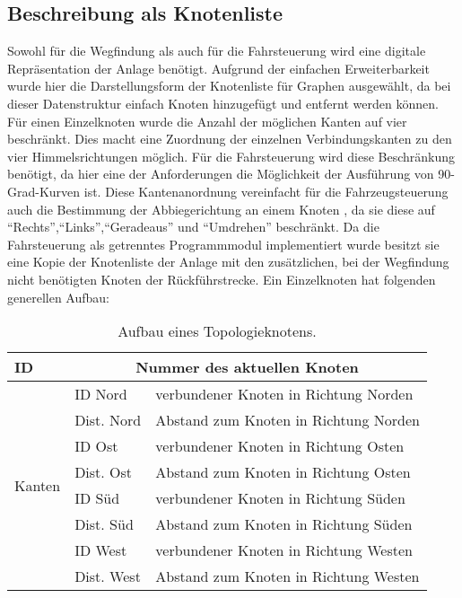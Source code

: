 		\subsection{Beschreibung als Knotenliste}
			\label{Knotenliste}
			Sowohl für die Wegfindung als auch für die Fahrsteuerung wird eine digitale Repräsentation der Anlage benötigt. Aufgrund der einfachen Erweiterbarkeit wurde hier die Darstellungsform der Knotenliste für Graphen ausgewählt, da bei dieser Datenstruktur einfach Knoten hinzugefügt und entfernt werden können. Für einen Einzelknoten wurde die Anzahl der möglichen Kanten auf vier beschränkt. Dies macht eine Zuordnung der einzelnen Verbindungskanten zu den vier Himmelsrichtungen möglich. Für die Fahrsteuerung wird diese Beschränkung benötigt, da hier eine der Anforderungen die Möglichkeit der Ausführung von 90-Grad-Kurven ist. Diese Kantenanordnung vereinfacht für die Fahrzeugsteuerung auch die Bestimmung der Abbiegerichtung an einem Knoten , da sie diese auf "`Rechts"',"`Links"',"`Geradeaus"' und "`Umdrehen"' beschränkt. Da die Fahrsteuerung als getrenntes Programmmodul implementiert wurde besitzt sie eine Kopie der Knotenliste der Anlage mit den zusätzlichen, bei der Wegfindung nicht benötigten Knoten der Rückführstrecke.
			Ein Einzelknoten hat folgenden generellen Aufbau:\\
			
			\begin{table}[h]
			
				\begin{tabular}{| l | l | l |}
					
					\hline
					\textbf{ID} &
					\multicolumn{2}{c|}{Nummer des aktuellen Knoten} \\[1pt]
					\hline \hline
					\multirow{8}{*}{Kanten}
						& ID Nord & verbundener Knoten in Richtung Norden \\[1pt] \cline{2-3}
						& Dist. Nord & Abstand zum Knoten in Richtung Norden\\[1pt] \cline{2-3}
						& ID Ost & verbundener Knoten in Richtung Osten \\[1pt] \cline{2-3}
						& Dist. Ost & Abstand zum Knoten in Richtung Osten\\[1pt] \cline{2-3}
						& ID Süd & verbundener Knoten in Richtung Süden\\[1pt] \cline{2-3}
						& Dist. Süd & Abstand zum Knoten in Richtung Süden\\[1pt] \cline{2-3}
						& ID West & verbundener Knoten in Richtung Westen\\[1pt] \cline{2-3}
						& Dist. West & Abstand zum Knoten in Richtung Westen\\[1pt] 
						\hline
				
				\end{tabular}
				\vspace{0.2cm}
				\caption{Aufbau eines Topologieknotens.}
			\end{table}
			

